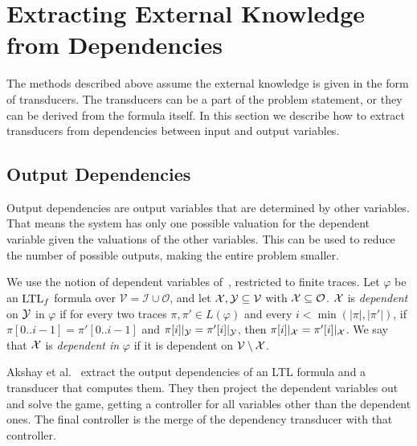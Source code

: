 \section{Extracting External Knowledge from Dependencies}\label{sec:dependencies}


The methods described above assume the external knowledge is given in the form of transducers. The transducers can be a part of the problem statement, or they can be derived from the formula itself. In this section we describe how to extract transducers from dependencies between input and output variables.

\subsection{Output Dependencies}
Output dependencies are output variables that are determined by other variables.
That means the system has only one possible valuation for the dependent variable given the valuations of the other variables.
This can be used to reduce the number of possible outputs, making the entire problem smaller.
\begin{definition}\label{def:outdep}
We use the notion of dependent variables of~\cite{AkshayBCF2024}, restricted to finite traces.
Let $\varphi$ be an $\text{LTL}_f$ formula over $\mathcal{V} = \mathcal{I} \cup \mathcal{O}$, and let $\mathcal{X}, \mathcal{Y} \subseteq \mathcal{V}$ with $\mathcal{X} \subseteq \mathcal{O}$.
$\mathcal{X}$ is \emph{dependent} on $\mathcal{Y}$ in $\varphi$ if for every two traces $\pi, \pi' \in L(\varphi)$ and every $i < \min(|\pi|, |\pi'|)$, if $\pi[0..i-1] = \pi'[0..i-1]$ and $\pi[i]|_{\mathcal{Y}} = \pi'[i]|_{\mathcal{Y}}$, then $\pi[i]|_{\mathcal{X}} = \pi'[i]|_{\mathcal{X}}$.
We say that $\mathcal{X}$ is \emph{dependent in} $\varphi$ if it is dependent on $\mathcal{V} \setminus \mathcal{X}$.
\end{definition}

Akshay et al.~\cite{AkshayBCF2024} extract the output dependencies of an LTL formula and a transducer that computes them.
They then project the dependent variables out and solve the game, getting a controller for all variables other than the dependent ones.
The final controller is the merge of the dependency transducer with that controller.

